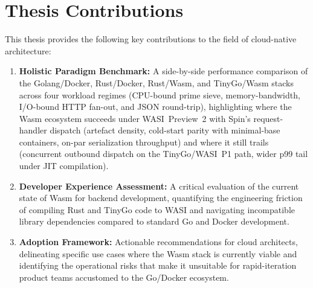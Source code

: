 \section{Thesis Contributions}
This thesis provides the following key contributions to the field of cloud-native architecture:
\begin{enumerate}
    \item \textbf{Holistic Paradigm Benchmark:} A side-by-side performance comparison of the Golang/Docker, Rust/Docker, Rust/\acs{Wasm}, and TinyGo/\acs{Wasm} stacks across four workload regimes (\acs{CPU}-bound prime sieve, memory-bandwidth, I/O-bound HTTP fan-out, and \acs{JSON} round-trip), highlighting where the \acs{Wasm} ecosystem succeeds under \acs{WASI}~Preview~2 with Spin's request-handler dispatch (artefact density, cold-start parity with minimal-base containers, on-par serialization throughput) and where it still trails (concurrent outbound dispatch on the TinyGo/\acs{WASI}~P1 path, wider p99 tail under JIT compilation).
    \item \textbf{Developer Experience Assessment:} A critical evaluation of the current state of \acs{Wasm} for backend development, quantifying the engineering friction of compiling Rust and TinyGo code to \acs{WASI} and navigating incompatible library dependencies compared to standard Go and Docker development.
    \item \textbf{Adoption Framework:} Actionable recommendations for cloud architects, delineating specific use cases where the \acs{Wasm} stack is currently viable and identifying the operational risks that make it unsuitable for rapid-iteration product teams accustomed to the Go/Docker ecosystem.
\end{enumerate}

